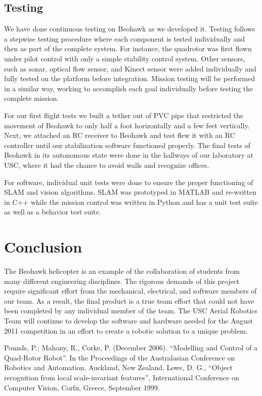 \documentclass[12pt, letterpaper]{article}
\begin{document}
\subsection{Testing}
We have done continuous testing on Beohawk as we developed it. Testing follows a stepwise testing procedure where each component is tested individually and then as part of the complete system. For instance, the quadrotor was first flown under pilot control with only a simple stability control system. Other sensors, such as sonar, optical flow sensor, and Kinect sensor were added individually and fully tested on the platform before integration. Mission testing will be performed in a similar way, working to accomplish each goal individually before testing the complete mission.

For our first flight tests we built a tether out of PVC pipe that restricted the movement of Beohawk to only half a foot horizontally and a few feet vertically.  Next, we attached an RC receiver to Beohawk and test flew it with an RC controller until our stabilization software functioned properly.  The final tests of Beohawk in its autonomous state were done in the hallways of our laboratory at USC, where it had the chance to avoid walls and recognize offices.

For software, individual unit tests were done to ensure the proper functioning of SLAM and vision algorithms.  SLAM was prototyped in MATLAB and re-written in C++ while the mission control was written in Python and has a unit test suite as well as a behavior test suite. 

\section{Conclusion}
The Beohawk helicopter is an example of the collaboration of students from many different engineering disciplines. The rigorous demands of this project require significant effort from the mechanical, electrical, and software members of our team. As a result, the final product is a true team effort that could not have been completed by any individual member of the team. The USC Aerial Robotics Team will continue to develop the software and hardware needed for the August 2011 competition in an effort to create a robotic solution to a unique problem.



\begin{thebibliography}{10}
Pounds, P.; Mahony, R., Corke, P. (December 2006). ``Modelling and Control of a Quad-Rotor Robot''. In the Proceedings of the Australasian Conference on Robotics and Automation. Auckland, New Zealand.
Lowe, D. G., ``Object recognition from local scale-invariant features'', International Conference on Computer Vision, Corfu, Greece, September 1999.
\end{thebibliography}
\end{document}
